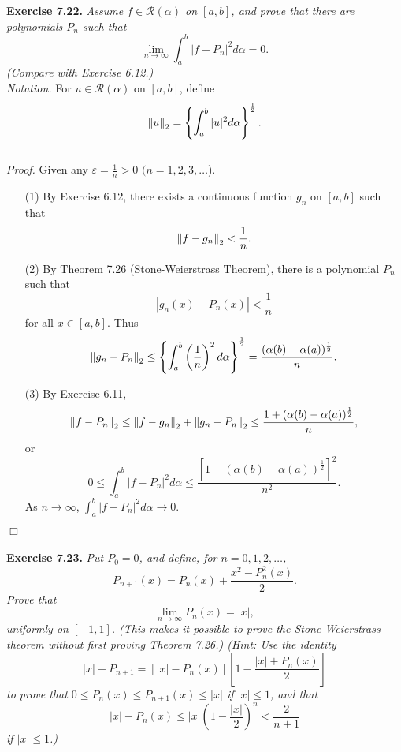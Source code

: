 \documentclass{article}
\begin{document}



\textbf{Exercise 7.22.}
\emph{Assume $f \in \mathscr{R}(\alpha)$ on $[a,b]$,
and prove that there are polynomials $P_n$ such that
\[
  \lim_{n \to \infty} \int_{a}^{b} |f-P_n|^2 d\alpha = 0.
\]
(Compare with Exercise 6.12.)} \\

\emph{Notation.}
For $u \in \mathscr{R}(\alpha)$ on $[a,b]$, define
  \[
    \norm{u}_2 = \left\{ \int_{a}^{b}|u|^2 d\alpha \right\}^{\frac{1}{2}}.
  \] \\

\emph{Proof.}
Given any $\varepsilon = \frac{1}{n} > 0$ $(n=1,2,3,\ldots$).
\begin{enumerate}
\item[(1)]
  By Exercise 6.12, there exists a continuous function $g_n$ on $[a,b]$
  such that
  \[
    \norm{f-g_n}_2 < \frac{1}{n}.
  \]

\item[(2)]
  By Theorem 7.26 (Stone-Weierstrass Theorem),
  there is a polynomial $P_n$ such that
  \[
    |g_n(x)-P_n(x)| < \frac{1}{n}
  \]
  for all $x \in [a,b]$.
  Thus
  \[
    \norm{g_n-P_n}_2
    \leq
    \left\{ \int_{a}^{b}\left(\frac{1}{n}\right)^2 d\alpha \right\}^{\frac{1}{2}}
    =
    \frac{(\alpha(b)-\alpha(a))^{\frac{1}{2}}}{n}.
  \]

\item[(3)]
  By Exercise 6.11,
  \[
    \norm{f-P_n}_2
    \leq
    \norm{f-g_n}_2 + \norm{g_n-P_n}_2
    \leq
    \frac{1+(\alpha(b)-\alpha(a))^{\frac{1}{2}}}{n},
  \]
  or
  \[
    0
    \leq
    \int_{a}^{b} |f-P_n|^2 d\alpha
    \leq
    \frac{[1+(\alpha(b)-\alpha(a))^{\frac{1}{2}}]^2}{n^2}.
  \]
  As $n \to \infty$, $\int_{a}^{b} |f-P_n|^2 d\alpha \to 0$.
\end{enumerate}
$\Box$ \\\\






\textbf{Exercise 7.23.}
\emph{Put $P_0 = 0$, and define, for $n = 0,1,2,\ldots$,
\[
  P_{n+1}(x) = P_n(x) + \frac{x^2-P_n^2(x)}{2}.
\]
Prove that
\[
  \lim_{n \to \infty} P_n(x) = |x|,
\]
uniformly on $[-1,1]$.
(This makes it possible to prove the Stone-Weierstrass theorem without
first proving Theorem 7.26.)
(Hint: Use the identity
\[
  |x| - P_{n+1} = [|x| - P_n(x)]\left[1-\frac{|x|+P_n(x)}{2}\right]
\]
to prove that $0 \leq P_n(x) \leq P_{n+1}(x) \leq |x|$ if $|x| \leq 1$, and that
\[
  |x| - P_n(x) \leq |x| \left(1-\frac{|x|}{2}\right)^n < \frac{2}{n+1}
\]
if $|x| \leq 1$.)} \\
\end{document}
